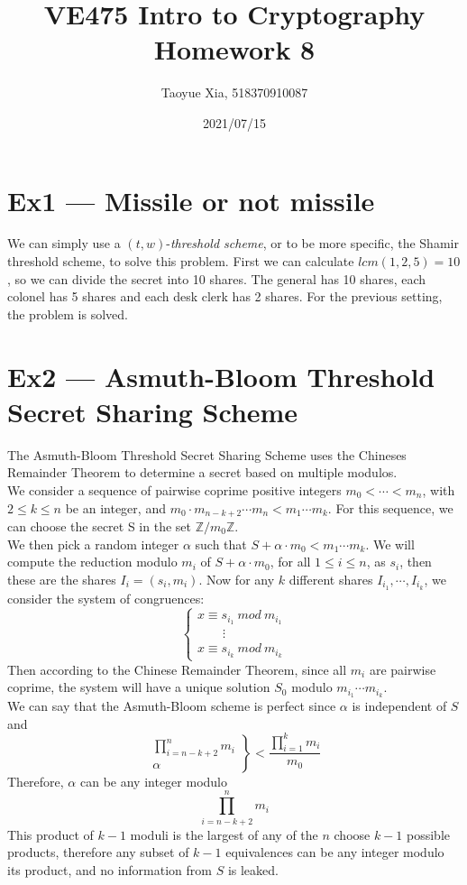 \documentclass[12pt, a4paper]{article}
\begin{document}
\title{VE475 Intro to Cryptography Homework 8}
\author{Taoyue Xia, 518370910087}
\date{2021/07/15}
\maketitle

\section*{Ex1 --- Missile or not missile}
We can simply use a $(t,w)$-\textit{threshold scheme}, or to be more specific, the Shamir threshold scheme, 
to solve this problem. First we can calculate $lcm(1,2,5) = 10$, so we can divide the secret into 10 shares. 
The general has 10 shares, each colonel has 5 shares and each desk clerk has 2 shares. 
For the previous setting, the problem is solved.

\section*{Ex2 --- Asmuth-Bloom Threshold Secret Sharing Scheme}
The Asmuth-Bloom Threshold Secret Sharing Scheme uses the Chineses Remainder Theorem to determine a secret based on multiple modulos.\\
We consider a sequence of pairwise coprime positive integers $m_0 < \cdots < m_n$, 
with $2 \leq k \leq n$ be an integer, and $m_0\cdot m_{n-k+2}\cdots m_n < m_1\cdots m_k$. For this sequence, 
we can choose the secret S in the set $\mathbb{Z}/m_0\mathbb{Z}$.\\
We then pick a random integer $\alpha$ such that $S + \alpha\cdot m_0 < m_1\cdots m_k$. 
We will compute the reduction modulo $m_i$ of $S + \alpha\cdot m_0$, for all $1 \leq i \leq n$, as $s_i$, 
then these are the shares $I_i = (s_i, m_i)$. 
Now for any $k$ different shares $I_{i_1},\cdots,I_{i_k}$, we consider the system of congruences:
$$
\begin{cases}
    x \equiv s_{i_1}\ mod\ m_{i_1}\\
    \qquad \vdots\\
    x \equiv s_{i_k}\ mod\ m_{i_k}
\end{cases}
$$
Then according to the Chinese Remainder Theorem, since all $m_i$ are pairwise coprime, 
the system will have a unique solution $S_0$ modulo $m_{i_1}\cdots m_{i_k}$.\\
We can say that the Asmuth-Bloom scheme is perfect since $\alpha$ is independent of $S$ and
$$
\left.{\begin{array}{r}\prod _{{i=n-k+2}}^{n}m_{i}\\\alpha \end{array}}\right\}<{\frac  {\prod _{{i=1}}^{k}m_{i}}{m_{0}}}
$$
Therefore, $\alpha$ can be any integer modulo
$$\prod_{i=n-k+2}^n m_i$$
This product of $k − 1$ moduli is the largest of any of the $n$ choose $k − 1$ possible products, 
therefore any subset of $k − 1$ equivalences can be any integer modulo its product, and no information from $S$ is leaked.
\end{document}
